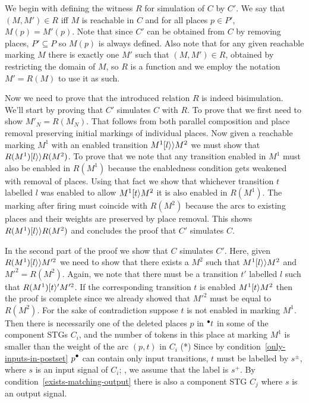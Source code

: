 We begin with defining the witness $R$ for simulation of $C$ by $C'$.
We say that $(M,M') \in R$ iff $M$ is reachable in $C$ and 
for all places $p \in P'$, $M(p)=M'(p)$.
Note that since $C'$ can be obtained from $C$ by removing places, $P' \subseteq P$ so $M(p)$ is always defined.
Also note that for any given reachable marking $M$ there is exactly one $M'$ such that $(M,M') \in R$, obtained by 
restricting the domain of $M$, so $R$ is a function and we employ the notation $M' = R(M)$ to use it as such.

Now we need to prove that the introduced relation $R$ is indeed bisimulation. 
We'll start by proving that $C'$ simulates $C$ with $R$.
To prove that we first need to show $M'_N = R(M_N)$. That follows from both parallel composition and place removal preserving initial markings of individual places.
Now given a reachable marking $M^1$ with an enabled transition $M^1 [l\rangle\rangle M^2$ we must show that $R(M^1) [l\rangle\rangle R(M^2)$. To prove that we note that any transition enabled in $M^1$ must also be enabled in $R(M^1)$ because the enabledness condition gets weakened with removal of places. Using that fact we show that whichever transition $t$ labelled $l$ was enabled to allow $M^1 [t\rangle M^2$ it is also enabled in $R(M^1)$. The marking after firing must coincide with $R(M^2)$ because the arcs to existing places and their weights are preserved by place removal. This shows $R(M^1) [l\rangle\rangle R(M^2)$ and concludes the proof that $C'$ simulates $C$.

In the second part of the proof we show that $C$ simulates $C'$. Here, given $R(M^1) [l\rangle\rangle M'^2$ we need to show that there exists a $M^2$ such that $M^1 [l\rangle\rangle M^2$ and $M'^2 = R(M^2)$. Again, we note that there must be a transition $t'$ labelled $l$ such that $R(M^1) [t\rangle' M'^2$. If the corresponding transition $t$ is enabled $M^1 [t\rangle M^2$ then the proof is complete since we already showed that $M'^2$ must be equal to $R(M^2)$. For the sake of contradiction suppose $t$ is not enabled in marking $M^1$. Then there is necessarily one of the deleted places $p$ in ${}^\bullet {t}$ in some of the component STGs $C_i$, and the number of tokens in this place at marking $M^1$ is
smaller than the weight of the arc $(p,t)$ in $C_i$ (*)
Since by condition~\ref{only-inputs-in-postset} $\post{p}$ can
contain only input transitions, $t$ must be labelled by
$s^\pm$, where $s$ is an input signal of $C_i$; \wlogg, we
assume that the label is $s^+$. By
condition~\ref{exists-matching-output} there is also a
component STG $C_j$ where $s$ is an output signal.


